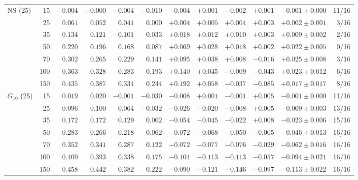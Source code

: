 \begin{tabular}{lrrrrrrrrrrr}
\midrule
NS (25) & 15 & $-0.004$ & $-0.000$ & $-0.004$ & $-0.010$ & $-0.004$ & $+0.001$ & $-0.002$ & $+0.001$ & $-0.001 \pm 0.000$ & 11/16 \\
 & 25 & $0.061$ & $0.052$ & $0.041$ & $0.000$ & $+0.004$ & $+0.005$ & $+0.004$ & $+0.003$ & $+0.002 \pm 0.001$ & 3/16 \\
 & 35 & $0.134$ & $0.121$ & $0.101$ & $0.033$ & $+0.018$ & $+0.012$ & $+0.010$ & $+0.003$ & $+0.009 \pm 0.002$ & 2/16 \\
 & 50 & $0.220$ & $0.196$ & $0.168$ & $0.087$ & $+0.069$ & $+0.028$ & $+0.018$ & $+0.002$ & $+0.022 \pm 0.005$ & 0/16 \\
 & 70 & $0.302$ & $0.265$ & $0.229$ & $0.141$ & $+0.095$ & $+0.038$ & $+0.008$ & $-0.016$ & $+0.025 \pm 0.008$ & 3/16 \\
 & 100 & $0.363$ & $0.328$ & $0.283$ & $0.193$ & $+0.140$ & $+0.045$ & $-0.009$ & $-0.043$ & $+0.023 \pm 0.012$ & 6/16 \\
 & 150 & $0.435$ & $0.387$ & $0.334$ & $0.244$ & $+0.192$ & $+0.058$ & $-0.037$ & $-0.085$ & $+0.017 \pm 0.017$ & 8/16 \\
\midrule
$G_{10}$ (25) & 15 & $0.019$ & $0.020$ & $-0.001$ & $-0.030$ & $-0.008$ & $+0.001$ & $-0.001$ & $+0.005$ & $-0.001 \pm 0.000$ & 11/16 \\
 & 25 & $0.096$ & $0.100$ & $0.064$ & $-0.032$ & $-0.026$ & $-0.020$ & $-0.008$ & $+0.005$ & $-0.009 \pm 0.003$ & 13/16 \\
 & 35 & $0.172$ & $0.172$ & $0.129$ & $0.002$ & $-0.054$ & $-0.045$ & $-0.022$ & $+0.008$ & $-0.023 \pm 0.006$ & 15/16 \\
 & 50 & $0.283$ & $0.266$ & $0.218$ & $0.062$ & $-0.072$ & $-0.068$ & $-0.050$ & $-0.005$ & $-0.046 \pm 0.013$ & 16/16 \\
 & 70 & $0.352$ & $0.341$ & $0.287$ & $0.122$ & $-0.072$ & $-0.077$ & $-0.076$ & $-0.029$ & $-0.062 \pm 0.016$ & 16/16 \\
 & 100 & $0.409$ & $0.393$ & $0.338$ & $0.175$ & $-0.101$ & $-0.113$ & $-0.113$ & $-0.057$ & $-0.094 \pm 0.021$ & 16/16 \\
 & 150 & $0.458$ & $0.442$ & $0.382$ & $0.222$ & $-0.090$ & $-0.121$ & $-0.146$ & $-0.097$ & $-0.113 \pm 0.022$ & 16/16 \\
\bottomrule
\end{tabular}
